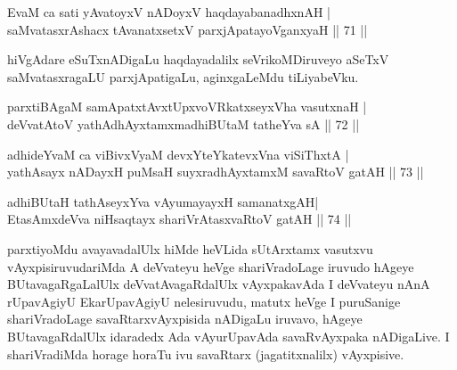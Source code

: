 
\begin{shl}
EvaM ca sati yAvatoyxV nADoyxV haqdayabanadhxnAH |\\
saMvatasxrAshacx tAvanatxsetxV parxjApatayoV\s ganxyaH \hfill || 71 || 
\end{shl}

\begin{artha}
hiVgAdare eSuTxnADigaLu haqdayadalilx seVrikoMDiruveyo aSeTxV saMvatasxragaLU parxjApatigaLu, aginxgaLeMdu tiLiyabeVku.
\end{artha}

\begin{shl}
\footnotemark[1]parxtiBAgaM samApatxtAvxtUpxvoVRkatxseyxVha vasutxnaH |\\
deVvatA\s toV yathA\s dhAyxtamxmadhiBUtaM tatheYva sA \hfill || 72 || 
\end{shl}

\begin{shl}
adhideYvaM ca viBivxVyaM devxYteYkatevxVna viSiThxtA |\\
\footnotemark[2]yathA\s sayx nADayxH puMsaH suyxradhAyxtamxM savaRtoV gatAH \hfill || 73 || 
\end{shl}

\begin{shl}
adhiBUtaH tathA\s seyxYva vAyumayayxH samanatxgAH|\\
\footnotemark[3]EtasAmxdeVva niHsaqtayx shariVrAtasxvaRtoV gatAH \hfill || 74 ||
\end{shl}

\begin{artha}
parxtiyoMdu avayavadalUlx hiMde heVLida sUtArxtamx vasutxvu vAyxpisiruvudariMda A deVvateyu heVge shariVradoLage iruvudo hAgeye BUtavagaRgaLalUlx deVvatAvagaRdalUlx vAyxpakavAda I deVvateyu nAnA rUpavAgiyU EkarUpavAgiyU nelesiruvudu, matutx heVge I puruSanige shariVradoLage savaRtarxvAyxpisida nADigaLu iruvavo, hAgeye BUtavagaRdalUlx idaradedx Ada vAyurUpavAda savaRvAyxpaka nADigaLive. I shariVradiMda horage horaTu ivu savaRtarx (jagatitxnalilx) vAyxpisive.
\end{artha}

